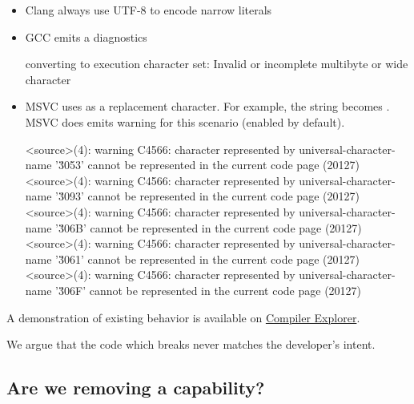 \documentclass{wg21}
\begin{document}
    \begin{itemize}
        \item Clang always use UTF-8 to encode narrow literals
        \item GCC emits a diagnostics

        \begin{quoteblock}
            converting to execution character set: Invalid or incomplete multibyte or wide character
        \end{quoteblock}
        \item MSVC uses  as a replacement character.
        For example, the string  becomes .
        MSVC does emits warning for this scenario (enabled by default).

        \begin{quoteblock}
            \begin{codeblock}
                <source>(4): warning C4566: character represented by universal-character-name
                '\u3053' cannot be represented in the current code page (20127)
                <source>(4): warning C4566: character represented by universal-character-name
                '\u3093' cannot be represented in the current code page (20127)
                <source>(4): warning C4566: character represented by universal-character-name
                '\u306B' cannot be represented in the current code page (20127)
                <source>(4): warning C4566: character represented by universal-character-name
                '\u3061' cannot be represented in the current code page (20127)
                <source>(4): warning C4566: character represented by universal-character-name
                '\u306F' cannot be represented in the current code page (20127)
            \end{codeblock}
        \end{quoteblock}

    \end{itemize}

    A demonstration of existing behavior is available on \href{https://compiler-explorer.com/z/4vheqx1oj}{Compiler Explorer}.

    We argue that the code which breaks never matches the developer's intent.

    \subsection{Are we removing a capability?}
\end{document}

